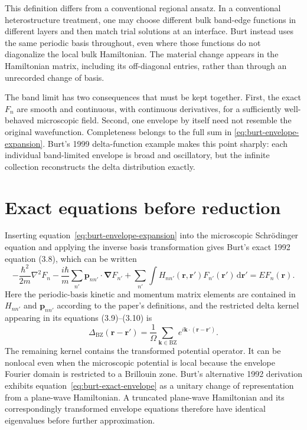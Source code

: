 This definition differs from a conventional regional ansatz. In a conventional
heterostructure treatment, one may choose different bulk band-edge functions in
different layers and then match trial solutions at an interface. Burt instead
uses the same periodic basis throughout, even where those functions do not
diagonalize the local bulk Hamiltonian. The material change appears in the
Hamiltonian matrix, including its off-diagonal entries, rather than through an
unrecorded change of basis.

The band limit has two consequences that must be kept together. First, the exact
$F_n$ are smooth and continuous, with continuous derivatives, for a sufficiently
well-behaved microscopic field. Second, one envelope by itself need not resemble
the original wavefunction. Completeness belongs to the full sum in
\eqref{eq:burt-envelope-expansion}. Burt's 1999 delta-function example makes this
point sharply: each individual band-limited envelope is broad and oscillatory,
but the infinite collection reconstructs the delta distribution exactly.

\section{Exact equations before reduction}

Inserting equation~\eqref{eq:burt-envelope-expansion} into the microscopic
Schr\"odinger equation and applying the inverse basis transformation gives
Burt's exact 1992 equation (3.8), which can be written
\begin{equation}
  -\frac{\hbar^2}{2m}\nabla^2F_n
  -\frac{i\hbar}{m}\sum_{n'}
    \mathbf p_{nn'}\mathbin{\cdot}\boldsymbol\nabla F_{n'}
  +\sum_{n'}\int
    H_{nn'}(\mathbf r,\mathbf r')F_{n'}(\mathbf r')
    \,\mathrm{d}\mathbf r'
  =
  E F_n(\mathbf r).
  \label{eq:burt-exact-envelope}
\end{equation}
Here the periodic-basis kinetic and momentum matrix elements are contained in
$H_{nn'}$ and $\mathbf p_{nn'}$ according to the paper's definitions, and the
restricted delta kernel appearing in its equations (3.9)--(3.10) is
\begin{equation}
  \Delta_{\mathrm{BZ}}(\mathbf r-\mathbf r')
  =
  \frac{1}{\Omega}
  \sum_{\mathbf k\in\mathrm{BZ}}
  e^{i\mathbf k\cdot(\mathbf r-\mathbf r')}.
  \label{eq:burt-restricted-delta}
\end{equation}
The remaining kernel contains the transformed potential operator. It can be
nonlocal even when the microscopic potential is local because the envelope
Fourier domain is restricted to a Brillouin zone. Burt's alternative 1992
derivation exhibits equation~\eqref{eq:burt-exact-envelope} as a unitary change
of representation from a plane-wave Hamiltonian. A truncated plane-wave
Hamiltonian and its correspondingly transformed envelope equations therefore
have identical eigenvalues before further approximation.

